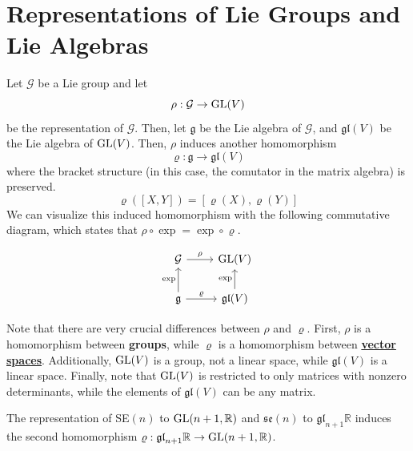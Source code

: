 \section{Representations of Lie Groups and Lie Algebras}

  Let $\mathcal{G}$ be a Lie group and let
  \begin{equation}
    \rho: \mathcal{G} \rightarrow \operatorname{GL}(V)
  \end{equation}
  be the representation of $\mathcal{G}$. Then, let $\mathfrak{g}$ be the Lie algebra of $\mathcal{G}$, and $\mathfrak{gl}(V)$ be the Lie algebra of $\operatorname{GL}(V)$. Then, $\rho$ induces another homomorphism 
  \begin{equation}
    \varrho: \mathfrak{g} \rightarrow \mathfrak{gl}(V)
  \end{equation}
  where the bracket structure (in this case, the comutator in the matrix algebra) is preserved. 
  \begin{equation}
    \varrho([X,Y]) = [\varrho(X), \varrho(Y)]
  \end{equation}
  We can visualize this induced homomorphism with the following commutative diagram, which states that $\rho \circ \exp = \exp \circ \varrho$. 

  \begin{equation}
    \begin{tikzcd}
      \mathcal{G} \arrow{r}{\rho} & \GL(V)\\
      \mathfrak{g} \arrow{u}{\exp} \arrow{r}{\varrho} & \mathfrak{gl}(V) \arrow{u}{\exp}
      \end{tikzcd}
  \end{equation}

  Note that there are very crucial differences between $\rho$ and $\varrho$. First, $\rho$ is a homomorphism between \textbf{groups}, while $\varrho$ is a homomorphism between \textbf{\hyperref[lin-def:vector-space]{vector spaces}}. Additionally, $\operatorname{GL}(V)$ is a group, not a linear space, while $\mathfrak{gl}(V)$ is a linear space. Finally, note that $\operatorname{GL}(V)$ is restricted to only matrices with nonzero determinants, while the elements of $\mathfrak{gl}(V)$ can be any matrix. 

  \begin{example}
    \label{ex:matrix-representation-of-sen}
    The representation of SE$(n)$ to $\operatorname{GL}(n+1, \mathbb{R})$ and $\mathfrak{se}(n)$ to $\mathfrak{gl}_{n+1} \mathbb{R}$ induces the second homomorphism $\varrho: \mathfrak{gl}_{n+1} \mathbb{R} \rightarrow \operatorname{GL}(n+1, \mathbb{R})$. 
  \end{example}

